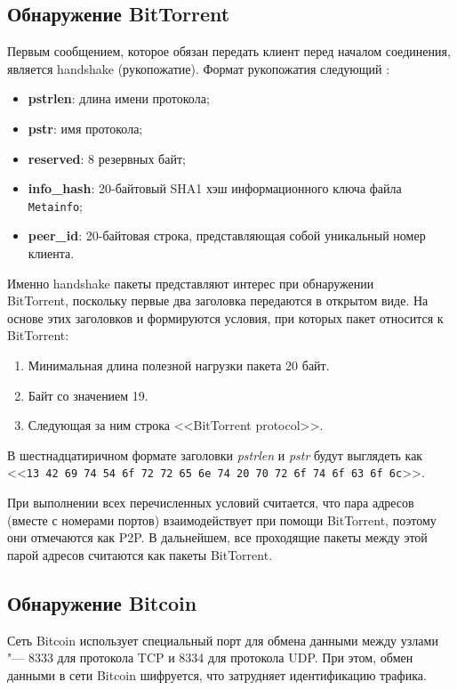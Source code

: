 \documentclass[bachelor, och, coursework]{SCWorks}
\begin{document}
\subsection{Обнаружение BitTorrent}
Первым сообщением, которое обязан передать клиент перед началом соединения, является handshake (рукопожатие).
Формат рукопожатия следующий \cite{bittorrent_sp}:
\begin{itemize}
    \item \textbf{pstrlen}: длина имени протокола;
    \item \textbf{pstr}: имя протокола;
    \item \textbf{reserved}: 8 резервных байт;
    \item \textbf{info_hash}: 20-байтовый SHA1 хэш информационного ключа файла \\ \texttt{Metainfo};
    \item \textbf{peer_id}: 20-байтовая строка, представляющая собой уникальный номер клиента.
\end{itemize}

Именно handshake пакеты представляют интерес при обнаружении \\ BitTorrent, поскольку первые два заголовка передаются в открытом виде. На основе этих заголовков и формируются условия, при которых пакет относится к BitTorrent:
\begin{enumerate}
    \item Минимальная длина полезной нагрузки пакета 20 байт.
    \item Байт со значением 19.
    \item Следующая за ним строка <<BitTorrent protocol>>.
\end{enumerate}

В шестнадцатиричном формате заголовки \textit{pstrlen} и \textit{pstr} будут выглядеть как <<\texttt{13 42 69 74 54 6f 72 72 65 6e 74 20 70 72 6f 74 6f 63 6f 6c}>>.

При выполнении всех перечисленных условий считается, что пара адресов (вместе с номерами портов) взаимодействует при помощи BitTorrent, поэтому они отмечаются как P2P. В дальнейшем, все проходящие пакеты между этой парой адресов считаются как пакеты BitTorrent.

\subsection{Обнаружение Bitcoin}
Сеть Bitcoin использует специальный порт для обмена данными между узлами "--- 8333 для протокола TCP и 8334 для протокола UDP. При этом, обмен данными в сети Bitcoin шифруется, что затрудняет идентификацию трафика.
\end{document}
